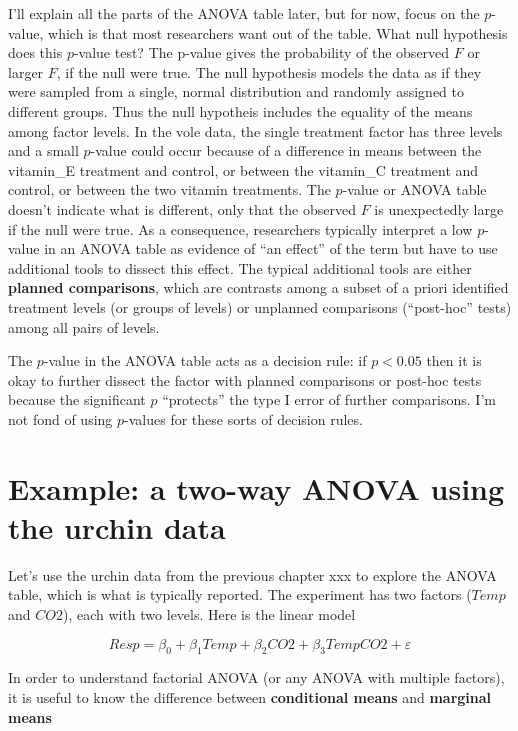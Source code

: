 \documentclass[]{book}
\begin{document}
I'll explain all the parts of the ANOVA table later, but for now, focus
on the \(p\)-value, which is that most researchers want out of the
table. What null hypothesis does this \(p\)-value test? The p-value
gives the probability of the observed \(F\) or larger \(F\), if the null
were true. The null hypothesis models the data as if they were sampled
from a single, normal distribution and randomly assigned to different
groups. Thus the null hypotheis includes the equality of the means among
factor levels. In the vole data, the single treatment factor has three
levels and a small \(p\)-value could occur because of a difference in
means between the vitamin\_E treatment and control, or between the
vitamin\_C treatment and control, or between the two vitamin treatments.
The \(p\)-value or ANOVA table doesn't indicate what is different, only
that the observed \(F\) is unexpectedly large if the null were true. As
a consequence, researchers typically interpret a low \(p\)-value in an
ANOVA table as evidence of ``an effect'' of the term but have to use
additional tools to dissect this effect. The typical additional tools
are either \textbf{planned comparisons}, which are contrasts among a
subset of a priori identified treatment levels (or groups of levels) or
unplanned comparisons (``post-hoc'' tests) among all pairs of levels.

The \(p\)-value in the ANOVA table acts as a decision rule: if
\(p < 0.05\) then it is okay to further dissect the factor with planned
comparisons or post-hoc tests because the significant \(p\) ``protects''
the type I error of further comparisons. I'm not fond of using
\(p\)-values for these sorts of decision rules.

\section{Example: a two-way ANOVA using the urchin
data}\label{example-a-two-way-anova-using-the-urchin-data}

Let's use the urchin data from the previous chapter xxx to explore the
ANOVA table, which is what is typically reported. The experiment has two
factors (\(Temp\) and \(CO2\)), each with two levels. Here is the linear
model

\begin{equation}
Resp = \beta_0 + \beta_1 Temp + \beta_2 CO2 + \beta_3 TempCO2 + \varepsilon
\end{equation}

In order to understand factorial ANOVA (or any ANOVA with multiple
factors), it is useful to know the difference between
\textbf{conditional means} and \textbf{marginal means}
\end{document}
